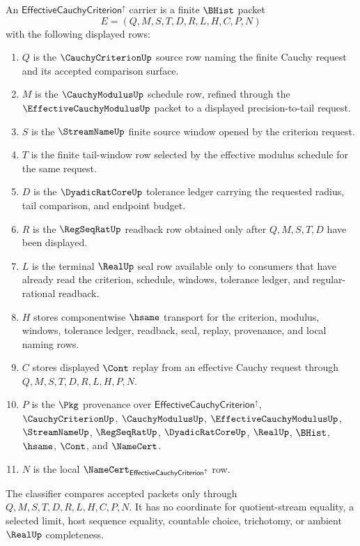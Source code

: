\begin{definition}
\label{def:effective-cauchy-criterion-carrier}
An $\mathsf{EffectiveCauchyCriterion}^{\uparrow}$ carrier is a finite $\BHist$ packet
$$
E=(Q,M,S,T,D,R,L,H,C,P,N)
$$
with the following displayed rows:
\begin{enumerate}
\item $Q$ is the $\CauchyCriterionUp$ source row naming the finite Cauchy request and its accepted comparison surface.
\item $M$ is the $\CauchyModulusUp$ schedule row, refined through the $\EffectiveCauchyModulusUp$ packet to a displayed precision-to-tail request.
\item $S$ is the $\StreamNameUp$ finite source window opened by the criterion request.
\item $T$ is the finite tail-window row selected by the effective modulus schedule for the same request.
\item $D$ is the $\DyadicRatCoreUp$ tolerance ledger carrying the requested radius, tail comparison, and endpoint budget.
\item $R$ is the $\RegSeqRatUp$ readback row obtained only after $Q,M,S,T,D$ have been displayed.
\item $L$ is the terminal $\RealUp$ seal row available only to consumers that have already read the criterion, schedule, windows, tolerance ledger, and regular-rational readback.
\item $H$ stores componentwise $\hsame$ transport for the criterion, modulus, windows, tolerance ledger, readback, seal, replay, provenance, and local naming rows.
\item $C$ stores displayed $\Cont$ replay from an effective Cauchy request through $Q,M,S,T,D,R,L,H,P,N$.
\item $P$ is the $\Pkg$ provenance over $\mathsf{EffectiveCauchyCriterion}^{\uparrow}$, $\CauchyCriterionUp$, $\CauchyModulusUp$, $\EffectiveCauchyModulusUp$, $\StreamNameUp$, $\RegSeqRatUp$, $\DyadicRatCoreUp$, $\RealUp$, $\BHist$, $\hsame$, $\Cont$, and $\NameCert$.
\item $N$ is the local $\NameCert_{\mathsf{EffectiveCauchyCriterion}^{\uparrow}}$ row.
\end{enumerate}
The classifier compares accepted packets only through $Q,M,S,T,D,R,L,H,C,P,N$. It has no coordinate for quotient-stream equality, a selected limit, host sequence equality, countable choice, trichotomy, or ambient $\RealUp$ completeness.
\end{definition}


